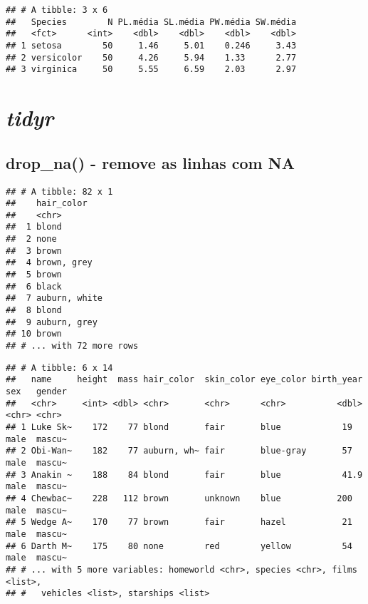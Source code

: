 \documentclass[]{book}
\newenvironment{Shaded}{\begin{snugshade}}{\end{snugshade}}
\newcommand{\KeywordTok}[1]{\textcolor[rgb]{0.13,0.29,0.53}{\textbf{#1}}}
\newcommand{\NormalTok}[1]{#1}
\newcommand{\OperatorTok}[1]{\textcolor[rgb]{0.81,0.36,0.00}{\textbf{#1}}}
\newcommand{\StringTok}[1]{\textcolor[rgb]{0.31,0.60,0.02}{#1}}
\begin{document}
\begin{verbatim}
## # A tibble: 3 x 6
##   Species        N PL.média SL.média PW.média SW.média
##   <fct>      <int>    <dbl>    <dbl>    <dbl>    <dbl>
## 1 setosa        50     1.46     5.01    0.246     3.43
## 2 versicolor    50     4.26     5.94    1.33      2.77
## 3 virginica     50     5.55     6.59    2.03      2.97
\end{verbatim}

\hypertarget{tidyr}{%
\chapter{\texorpdfstring{\emph{tidyr}}{tidyr}}\label{tidyr}}

\hypertarget{drop_na---remove-as-linhas-com-na}{%
\section{drop\_na() - remove as linhas com NA}\label{drop_na---remove-as-linhas-com-na}}

\begin{Shaded}
\end{Shaded}

\begin{verbatim}
## # A tibble: 82 x 1
##    hair_color   
##    <chr>        
##  1 blond        
##  2 none         
##  3 brown        
##  4 brown, grey  
##  5 brown        
##  6 black        
##  7 auburn, white
##  8 blond        
##  9 auburn, grey 
## 10 brown        
## # ... with 72 more rows
\end{verbatim}

\begin{Shaded}
\end{Shaded}

\begin{verbatim}
## # A tibble: 6 x 14
##   name     height  mass hair_color  skin_color eye_color birth_year sex   gender
##   <chr>     <int> <dbl> <chr>       <chr>      <chr>          <dbl> <chr> <chr> 
## 1 Luke Sk~    172    77 blond       fair       blue            19   male  mascu~
## 2 Obi-Wan~    182    77 auburn, wh~ fair       blue-gray       57   male  mascu~
## 3 Anakin ~    188    84 blond       fair       blue            41.9 male  mascu~
## 4 Chewbac~    228   112 brown       unknown    blue           200   male  mascu~
## 5 Wedge A~    170    77 brown       fair       hazel           21   male  mascu~
## 6 Darth M~    175    80 none        red        yellow          54   male  mascu~
## # ... with 5 more variables: homeworld <chr>, species <chr>, films <list>,
## #   vehicles <list>, starships <list>
\end{verbatim}
\end{document}
